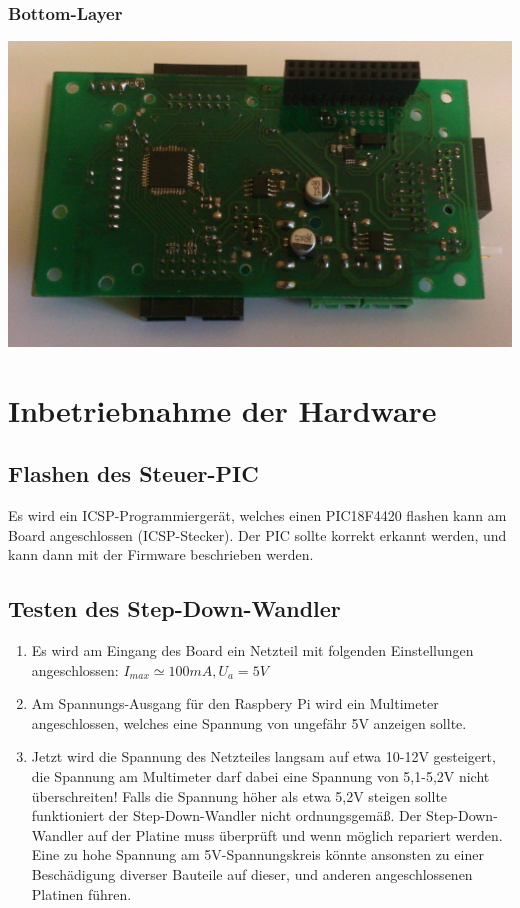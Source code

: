 \documentclass[a4paper,10pt]{article}
\begin{document}
\subsubsection{Bottom-Layer}

\includegraphics[width=\textwidth]{pointhiboard_board_bottom} \\

\newpage

\section{Inbetriebnahme der Hardware}

\subsection{Flashen des Steuer-PIC}

Es wird ein ICSP-Programmiergerät, welches einen PIC18F4420 flashen kann am Board angeschlossen (ICSP-Stecker). Der PIC sollte korrekt erkannt werden, und kann dann mit der Firmware beschrieben werden.

\subsection{Testen des Step-Down-Wandler}

\begin{enumerate}
 \item Es wird am Eingang des Board ein Netzteil mit folgenden Einstellungen angeschlossen: $I_{max} \simeq 100mA, U_a = 5V$
 \item Am Spannungs-Ausgang für den Raspbery Pi wird ein Multimeter angeschlossen, welches eine Spannung von ungefähr 5V anzeigen sollte.
 \item Jetzt wird die Spannung des Netzteiles langsam auf etwa 10-12V gesteigert, die Spannung am Multimeter darf dabei eine Spannung von 5,1-5,2V nicht überschreiten!
Falls die Spannung höher als etwa 5,2V steigen sollte funktioniert der Step-Down-Wandler nicht ordnungsgemäß. Der Step-Down-Wandler auf der Platine muss überprüft und wenn möglich repariert werden. Eine zu hohe Spannung am 5V-Spannungskreis könnte ansonsten zu einer Beschädigung diverser Bauteile auf dieser, und anderen angeschlossenen Platinen führen.
\end{enumerate}
\end{document}
